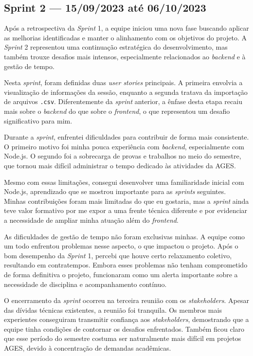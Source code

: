 \clearpage
\subsection{Sprint 2 --- 15/09/2023 até 06/10/2023}

Após a retrospectiva da \textit{Sprint} 1, a equipe iniciou uma nova fase buscando aplicar as melhorias identificadas e manter o alinhamento com os objetivos do projeto. A \textit{Sprint} 2 representou uma continuação estratégica do desenvolvimento, mas também trouxe desafios mais intensos, especialmente relacionados ao \textit{backend} e à gestão de tempo.

Nesta \textit{sprint}, foram definidas duas \textit{user stories} principais. A primeira envolvia a visualização de informações da sessão, enquanto a segunda tratava da importação de arquivos \texttt{.csv}. Diferentemente da \textit{sprint} anterior, a ênfase desta etapa recaiu mais sobre o \textit{backend} do que sobre o \textit{frontend}, o que representou um desafio significativo para mim.

Durante a \textit{sprint}, enfrentei dificuldades para contribuir de forma mais consistente. O primeiro motivo foi minha pouca experiência com \textit{backend}, especialmente com Node.js. O segundo foi a sobrecarga de provas e trabalhos no meio do semestre, que tornou mais difícil administrar o tempo dedicado às atividades da \ac{AGES}.

Mesmo com essas limitações, consegui desenvolver uma familiaridade inicial com Node.js, aprendizado que se mostrou importante para as \textit{sprints} seguintes. Minhas contribuições foram mais limitadas do que eu gostaria, mas a \textit{sprint} ainda teve valor formativo por me expor a uma frente técnica diferente e por evidenciar a necessidade de ampliar minha atuação além do \textit{frontend}.

As dificuldades de gestão de tempo não foram exclusivas minhas. A equipe como um todo enfrentou problemas nesse aspecto, o que impactou o projeto. Após o bom desempenho da \textit{Sprint} 1, percebi que houve certo relaxamento coletivo, resultando em contratempos. Embora esses problemas não tenham comprometido de forma definitiva o projeto, funcionaram como um alerta importante sobre a necessidade de disciplina e acompanhamento contínuo.

O encerramento da \textit{sprint} ocorreu na terceira reunião com os \textit{stakeholders}. Apesar das dívidas técnicas existentes, a reunião foi tranquila. Os membros mais experientes conseguiram transmitir confiança aos \textit{stakeholders}, demostrando que a equipe tinha condições de contornar os desafios enfrentados. Também ficou claro que esse período do semestre costuma ser naturalmente mais difícil em projetos \ac{AGES}, devido à concentração de demandas acadêmicas.
